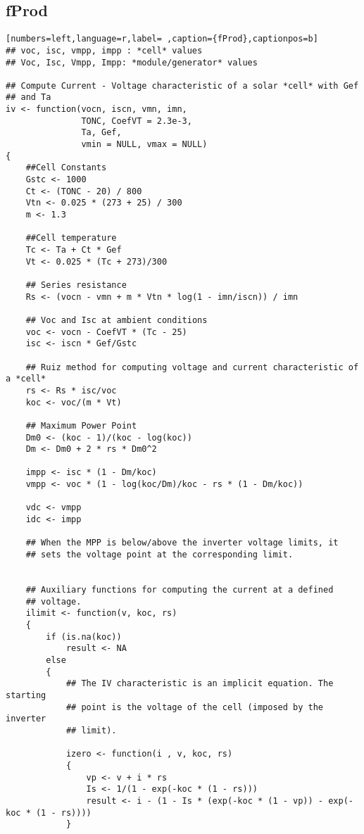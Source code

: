 \subsection{fProd}
\label{sec:orga08c757}
\label{subsec:fprod}
\begin{lstlisting}[numbers=left,language=r,label= ,caption={fProd},captionpos=b]
## voc, isc, vmpp, impp : *cell* values
## Voc, Isc, Vmpp, Impp: *module/generator* values

## Compute Current - Voltage characteristic of a solar *cell* with Gef
## and Ta
iv <- function(vocn, iscn, vmn, imn,
               TONC, CoefVT = 2.3e-3,
               Ta, Gef,
               vmin = NULL, vmax = NULL)
{
    ##Cell Constants
    Gstc <- 1000
    Ct <- (TONC - 20) / 800
    Vtn <- 0.025 * (273 + 25) / 300
    m <- 1.3

    ##Cell temperature
    Tc <- Ta + Ct * Gef
    Vt <- 0.025 * (Tc + 273)/300

    ## Series resistance
    Rs <- (vocn - vmn + m * Vtn * log(1 - imn/iscn)) / imn

    ## Voc and Isc at ambient conditions
    voc <- vocn - CoefVT * (Tc - 25)
    isc <- iscn * Gef/Gstc

    ## Ruiz method for computing voltage and current characteristic of a *cell*
    rs <- Rs * isc/voc
    koc <- voc/(m * Vt)

    ## Maximum Power Point
    Dm0 <- (koc - 1)/(koc - log(koc))
    Dm <- Dm0 + 2 * rs * Dm0^2

    impp <- isc * (1 - Dm/koc)
    vmpp <- voc * (1 - log(koc/Dm)/koc - rs * (1 - Dm/koc))

    vdc <- vmpp
    idc <- impp

    ## When the MPP is below/above the inverter voltage limits, it
    ## sets the voltage point at the corresponding limit.


    ## Auxiliary functions for computing the current at a defined
    ## voltage.
    ilimit <- function(v, koc, rs) 
    {
        if (is.na(koc)) 
            result <- NA
        else
        {
            ## The IV characteristic is an implicit equation. The starting
            ## point is the voltage of the cell (imposed by the inverter
            ## limit). 

            izero <- function(i , v, koc, rs)
            {
                vp <- v + i * rs
                Is <- 1/(1 - exp(-koc * (1 - rs)))
                result <- i - (1 - Is * (exp(-koc * (1 - vp)) - exp(-koc * (1 - rs))))
            }


\end{lstlisting}
